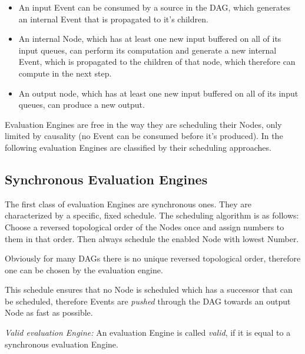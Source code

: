 \begin{itemize}
  \item An input Event can be consumed by a source in the DAG, which generates an internal Event that is propagated to it's children.
  \item An internal Node, which has at least one new input buffered on all of its input queues, can perform
    its computation and generate a new internal Event, which is propagated to the children of that node, which therefore can compute in the next step.
  \item An output node, which has at least one new input buffered on all of its input queues, can produce a new output.
\end{itemize}

Evaluation Engines are free in the way they are scheduling their Nodes, only limited by causality (no Event can be consumed before it's produced).
In the following evaluation Engines are classified by their scheduling approaches.

\subsection{Synchronous Evaluation Engines}
\label{sec:concepts:behaviour_without_timing:synchronous}

The first class of evaluation Engines are synchronous ones.
They are characterized by a specific, fixed schedule.
The scheduling algorithm is as follows: Choose a reversed topological order of the Nodes once and assign numbers to them in that order.
Then always schedule the enabled Node with lowest Number.

Obviously for many DAGs there is no unique reversed topological order, therefore one can be chosen by the evaluation engine.

This schedule ensures that no Node is scheduled which has a successor that can be scheduled, therefore Events are \emph{pushed} through the DAG towards an output Node as fast as possible.

\begin{definition}
  \emph{Valid evaluation Engine:} An evaluation Engine is called \emph{valid}, if it is equal to a synchronous evaluation Engine.
\label{def:valid_eval_engine}
\end{definition}


